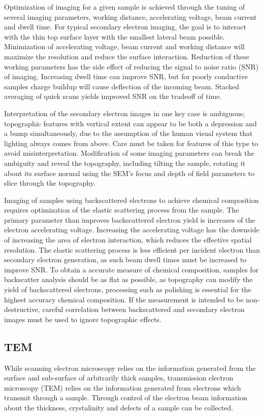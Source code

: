 Optimization of imaging for a given sample is achieved through the tuning of several imaging parameters, working distance, accelerating voltage, beam current and dwell time\cite{goldstein2003scanning}.
For typical secondary electron imaging, the goal is to interact with the thin top surface layer with the smallest lateral beam possible.
Minimization of accelerating voltage, beam current and working distance will maximize the resolution and reduce the surface interaction.
Reduction of these working parameters has the side effect of reducing the signal to noise ratio (SNR) of imaging.
Increasing dwell time can improve SNR, but for poorly conductive samples charge buildup will cause deflection of the incoming beam.
Stacked averaging of quick scans yields improved SNR on the tradeoff of time.

Interpretation of the secondary electron images in one key case is ambiguous; topographic features with vertical extent can appear to be both a depression and a bump simultaneously, due to the assumption of the human visual system that lighting always comes from above\cite{goldstein2003scanning}.
Care must be taken for features of this type to avoid misinterpretation.
Modification of some imaging parameters can break the ambiguity and reveal the topography, including tilting the sample, rotating it about its surface normal using the SEM's focus and depth of field parameters to slice through the topography.

Imaging of samples using backscattered electrons to achieve chemical composition requires optimization of the elastic scattering process from the sample.
The primary parameter than improves backscattered electron yield is increases of the electron accelerating voltage.
Increasing the accelerating voltage has the downside of increasing the area of electron interaction, which reduces the effective spatial resolution\cite{goldstein2003scanning}.
The elastic scattering process is less efficient per incident electron than secondary electron generation, as such beam dwell times must be increased to improve SNR\@.
To obtain a accurate measure of chemical composition, samples for backscatter analysis should be as flat as possible, as topography can modify the yield of backscattered electrons, processing such as polishing is essential for the highest accuracy chemical composition.
If the measurement is intended to be non-destructive, careful correlation between backscattered and secondary electron images must be used to ignore topographic effects.
\subsection{TEM} While scanning electron microscopy relies on the information generated from the surface and sub-surface of arbitrarily thick samples, transmission electron microscopy (TEM) relies on the information generated from electrons which transmit through a sample.
Through control of the electron beam information about the thickness, crystalinity and defects of a sample can be collected.

